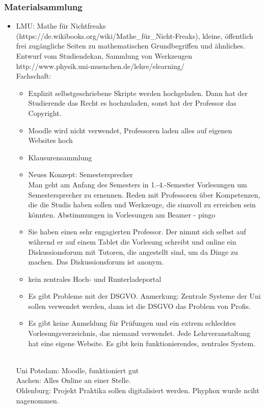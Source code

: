 \subsubsection*{Materialsammlung}
	\begin{itemize}
		\item LMU: Mathe für Nichtfreaks (https://de.wikibooks.org/wiki/Mathe_für_Nicht-Freaks), kleine, öffentlich frei zugängliche Seiten zu mathematischen Grundbegriffen und ähnliches.
			Entwurf vom Studiendekan, Sammlung von Werkzeugen
			http://www.physik.uni-muenchen.de/lehre/elearning/\\

			Fachschaft:
			\begin{itemize}
				\item Explizit selbstgeschriebene Skripte werden hochgeladen. Dann hat der Studierende das Recht es hochzuladen, sonst hat der Professor das Copyright.\\

				\item Moodle wird nicht verwendet, Professoren laden alles auf eigenen Websites hoch
				\item Klausurensammlung

				\item Neues Konzept:
				Semestersprecher \\
				Man geht am Anfang des Semesters in 1.-4.-Semester Vorlesungen um Semestersprecher zu ernennen.
				Reden mit Professoren über Kompetenzen, die die Studis haben sollen und Werkzeuge, die sinnvoll zu erreichen sein könnten.
				Abstimmungen in Vorlesungen am Beamer - pingo

				\item Sie haben einen sehr engagierten Professor.
				Der nimmt sich selbst auf während er auf einem Tablet die Vorlesung schreibt
				und online ein Diskussionsforum mit Tutoren, die angestellt sind, um da Dinge zu machen.
				Das Diskussionsforum ist anonym.

				\item kein zentrales Hoch- und Runterladeportal

				\item Es gibt Probleme mit der DSGVO.
				Anmerkung: Zentrale Systeme der Uni sollen verwendet werden, dann ist die DSGVO das Problem von Profis.

				\item Es gibt keine Anmeldung für Prüfungen und ein extrem schlechtes Vorlesungsverzeichnis, das niemand verwendet.
				Jede Lehrveranstaltung hat eine eigene Website. Es gibt kein funktionierendes, zentrales System.
			\end{itemize} \\
			Uni Potsdam: Moodle, funktioniert gut
			 \\
			Aachen: Alles Online an einer Stelle.
			 \\
			 Oldenburg: Projekt Praktika sollen digitalisiert werden. Phyphox wurde nciht nagenommen.


\end{itemize}
